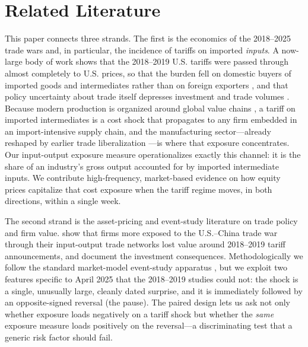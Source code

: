 \documentclass[12pt]{article}
\begin{document}
\section{Related Literature}\label{sec:lit}
This paper connects three strands. The first is the economics of the 2018--2025 trade wars
and, in particular, the incidence of tariffs on imported \emph{inputs}. A now-large body of
work shows that the 2018--2019 U.S. tariffs were passed through almost completely to U.S.
prices, so that the burden fell on domestic buyers of imported goods and intermediates rather
than on foreign exporters \citep{amiti2019,fajgelbaum2020}, and that policy uncertainty about
trade itself depresses investment and trade volumes \citep{handley2017,amiti2020}. Because
modern production is organized around global value chains \citep{antras2013}, a tariff on
imported intermediates is a cost shock that propagates to any firm embedded in an
import-intensive supply chain, and the manufacturing sector---already reshaped by earlier
trade liberalization \citep{pierce2016}---is where that exposure concentrates. Our
input-output exposure measure operationalizes exactly this channel: it is the share of an
industry's gross output accounted for by imported intermediate inputs. We contribute
high-frequency, market-based evidence on how equity prices capitalize that cost exposure when
the tariff regime moves, in both directions, within a single week.

The second strand is the asset-pricing and event-study literature on trade policy and firm
value. \citet{huang2023} show that firms more exposed to the U.S.--China trade war through
their input-output trade networks lost value around 2018--2019 tariff announcements, and
\citet{amiti2020} document the investment consequences. Methodologically we follow the
standard market-model event-study apparatus \citep{mackinlay1997,campbell1997,fama1993}, but
we exploit two features specific to April 2025 that the 2018--2019 studies could not: the
shock is a single, unusually large, cleanly dated surprise, and it is immediately followed by
an opposite-signed reversal (the pause). The paired design lets us ask not only whether
exposure loads negatively on a tariff shock but whether the \emph{same} exposure measure loads
positively on the reversal---a discriminating test that a generic risk factor should fail.
\end{document}
